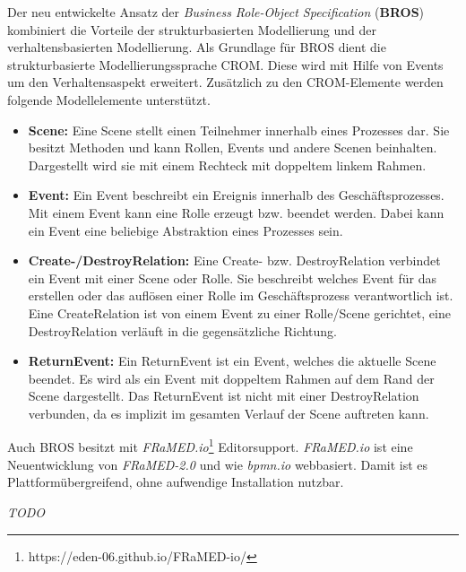 Der neu entwickelte Ansatz der \emph{Business Role-Object Specification} (\textbf{BROS}) kombiniert die Vorteile der strukturbasierten Modellierung und der verhaltensbasierten Modellierung.
Als Grundlage für BROS dient die strukturbasierte Modellierungssprache CROM.
Diese wird mit Hilfe von Events um den Verhaltensaspekt erweitert.
Zusätzlich zu den CROM-Elemente werden folgende Modellelemente unterstützt.

\begin{itemize}
    \item \textbf{Scene:}
    Eine Scene stellt einen Teilnehmer innerhalb eines Prozesses dar.
    Sie besitzt Methoden und kann Rollen, Events und andere Scenen beinhalten.
    Dargestellt wird sie mit einem Rechteck mit doppeltem linkem Rahmen.
    \item \textbf{Event:}
    Ein Event beschreibt ein Ereignis innerhalb des Geschäftsprozesses.
    Mit einem Event kann eine Rolle erzeugt bzw. beendet werden.
    Dabei kann ein Event eine beliebige Abstraktion eines Prozesses sein.
    \item \textbf{Create-/DestroyRelation:}
    Eine Create- bzw. DestroyRelation verbindet ein Event mit einer Scene oder Rolle.
    Sie beschreibt welches Event für das erstellen oder das auflösen einer Rolle im Geschäftsprozess verantwortlich ist.
    Eine CreateRelation ist von einem Event zu einer Rolle/Scene gerichtet, eine DestroyRelation verläuft in die gegensätzliche Richtung.
    \item \textbf{ReturnEvent:}
    Ein ReturnEvent ist ein Event, welches die aktuelle Scene beendet.
    Es wird als ein Event mit doppeltem Rahmen auf dem Rand der Scene dargestellt.
    Das ReturnEvent ist nicht mit einer DestroyRelation verbunden, da es implizit im gesamten Verlauf der Scene auftreten kann.
\end{itemize}

Auch BROS besitzt mit \emph{FRaMED.io}\footnote{https://eden-06.github.io/FRaMED-io/} Editorsupport.
\emph{FRaMED.io} ist eine Neuentwicklung von \emph{FRaMED-2.0} und wie \emph{bpmn.io} webbasiert.
Damit ist es Plattformübergreifend, ohne aufwendige Installation nutzbar.

\textit{TODO}

